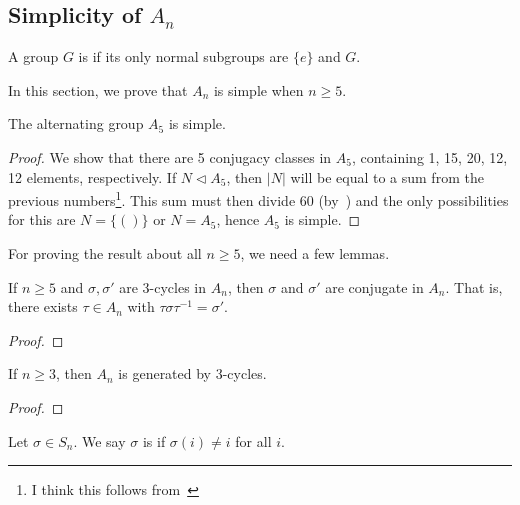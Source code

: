 \subsection{Simplicity of \(A_{n}\)}

\begin{definition}
  A group \(G\) is  if its only normal subgroups are \(\{e\}\) and \(G\).
\end{definition}

In this section, we prove that \(A_{n}\) is simple when \(n \geq 5\).

\begin{theorem}\label{thm:group-theory:A5-is-simple}
  The alternating group \(A_{5}\) is simple.
\end{theorem}

\begin{proof}
  We show that there are 5 conjugacy classes in \(A_{5}\), containing 1, 15, 20, 12, 12 elements, respectively. If \(N \triangleleft A_{5}\), then \(|N|\) will be equal to a sum from the previous numbers\footnote{I think this follows from~}. This sum must then divide 60 (by~) and the only possibilities for this are \(N = \{()\}\) or \(N = A_{5}\), hence \(A_{5}\) is simple.
\end{proof}

For proving the result about all \(n \geq 5\), we need a few lemmas.

\begin{lemma}
  If \(n \geq 5\) and \(\sigma, \sigma'\) are 3-cycles in \(A_{n}\), then \(\sigma\) and \(\sigma'\) are conjugate in \(A_{n}\). That is, there exists \(\tau \in A_{n}\) with \(\tau \sigma \tau^{-1} = \sigma'\).
\end{lemma}

\begin{proof}
\end{proof}

\begin{lemma}
  If \(n \geq 3\), then \(A_{n}\) is generated by 3-cycles.
\end{lemma}

\begin{proof}
\end{proof}

\begin{definition}
  Let \(\sigma \in S_{n}\). We say \(\sigma\) is  if \(\sigma(i) \neq i\) for all \(i\).
\end{definition}

